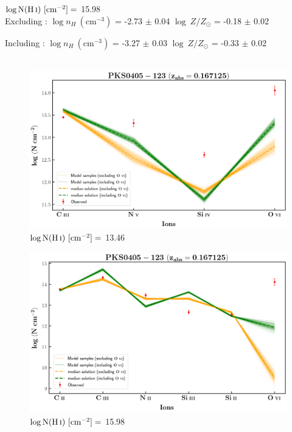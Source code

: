   $\log \text{N}(\ion{H}{i}) \ [\text{cm}^{-2}]=$  15.98  \\ 
  
  Excluding  : $\log n_H \ (\text{cm}^{-3})$ = -2.73 $\pm$ 0.04 \hspace{10mm} $\log \ Z/Z_\odot$ = -0.18 $\pm$ 0.02
  
  Including  : $\log n_H \ (\text{cm}^{-3})$ = -3.27 $\pm$ 0.03 \hspace{10mm} $\log \ Z/Z_\odot$ = -0.33 $\pm$ 0.02
  \\\\
  
  \begin{figure}[!h]
    \centering
    \includegraphics[width=0.9\linewidth]{Ionisation-Modelling-Plots/pks0405-z=0.167125-compII.png}
    \caption{$\log \text{N}(\ion{H}{i}) \ [\text{cm}^{-2}]=$ 13.46}
  \end{figure}
  
  
  \newpage
  
  \begin{figure}[!h]
    \centering
    \includegraphics[width=0.9\linewidth]{Ionisation-Modelling-Plots/pks0405-z=0.167125-compIV.png}
    \caption{$\log \text{N}(\ion{H}{i}) \ [\text{cm}^{-2}]=$ 15.98}
  \end{figure}
  
